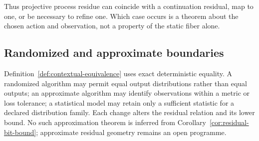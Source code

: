 Thus projective process residue can coincide with a continuation residual, map
to one, or be necessary to refine one.  Which case occurs is a theorem about
the chosen action and observation, not a property of the static fiber alone.

\subsection{Randomized and approximate boundaries}

Definition~\ref{def:contextual-equivalence} uses exact deterministic equality.
A randomized algorithm may permit equal output distributions rather than equal
outputs; an approximate algorithm may identify observations within a metric or
loss tolerance; a statistical model may retain only a sufficient statistic for
a declared distribution family.  Each change alters the residual relation and
its lower bound.  No such approximation theorem is inferred from
Corollary~\ref{cor:residual-bit-bound}; approximate residual geometry remains an
open programme.
